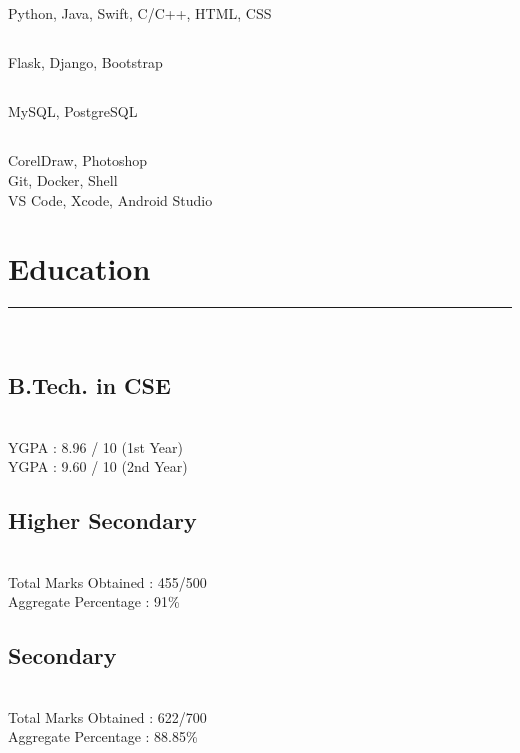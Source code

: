 \documentclass[]{debjitpal-resume}
\begin{document}
\begin{minipage}[t]{0.35\textwidth}
  \subsection{}
  Python, Java, Swift, C/C++, HTML, CSS
  \vspace{6pt}
  \subsection{}
  Flask, Django, Bootstrap
  \vspace{6pt}
  \subsection{}
  MySQL, PostgreSQL
  \vspace{6pt}
  \subsection{}
  CorelDraw, Photoshop \\
  Git, Docker, Shell \\
  VS Code, Xcode, Android Studio
  \section{Education}
  \noindent\rule{5cm}{0.4pt}\\
  \subsection{B.Tech. in CSE}
   \\
  YGPA : 8.96 / 10 (1st Year)\\
  YGPA : 9.60 / 10 (2nd Year)\\
  \vspace{8pt}
  \subsection{Higher Secondary}
  \\
  Total Marks Obtained : 455/500 \\
  Aggregate Percentage : 91\%\\
  \vspace{8pt}
  \subsection{Secondary}
  \\
  Total Marks Obtained : 622/700 \\
  Aggregate Percentage : 88.85\%
\end{minipage}
\end{document}
